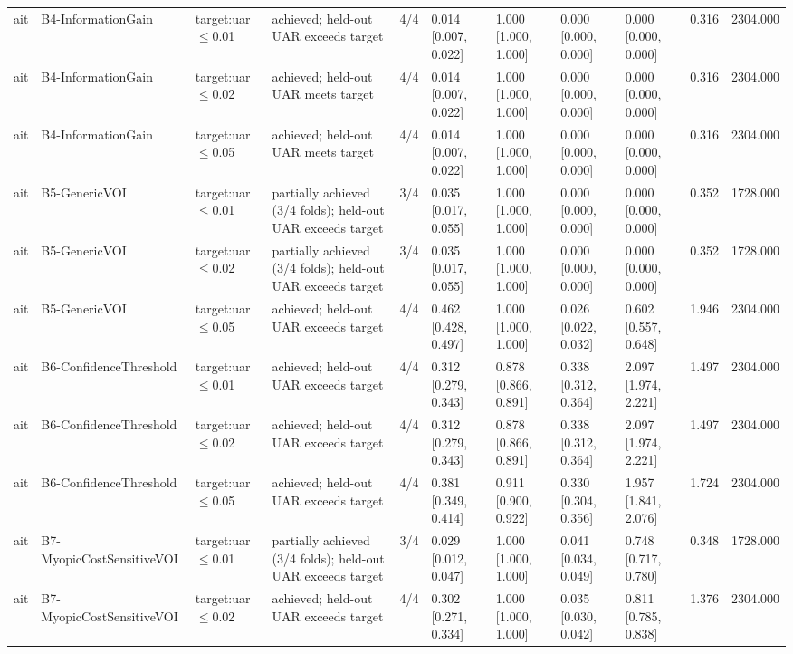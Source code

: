 \begin{table}[!ht]
{\begin{tabular}{lllllllllll}
ait & B4-InformationGain & target:uar$\le$0.01 & achieved; held-out UAR exceeds target & 4/4 & 0.014 [0.007, 0.022] & 1.000 [1.000, 1.000] & 0.000 [0.000, 0.000] & 0.000 [0.000, 0.000] & 0.316 & 2304.000 \\
ait & B4-InformationGain & target:uar$\le$0.02 & achieved; held-out UAR meets target & 4/4 & 0.014 [0.007, 0.022] & 1.000 [1.000, 1.000] & 0.000 [0.000, 0.000] & 0.000 [0.000, 0.000] & 0.316 & 2304.000 \\
ait & B4-InformationGain & target:uar$\le$0.05 & achieved; held-out UAR meets target & 4/4 & 0.014 [0.007, 0.022] & 1.000 [1.000, 1.000] & 0.000 [0.000, 0.000] & 0.000 [0.000, 0.000] & 0.316 & 2304.000 \\
ait & B5-GenericVOI & target:uar$\le$0.01 & partially achieved (3/4 folds); held-out UAR exceeds target & 3/4 & 0.035 [0.017, 0.055] & 1.000 [1.000, 1.000] & 0.000 [0.000, 0.000] & 0.000 [0.000, 0.000] & 0.352 & 1728.000 \\
ait & B5-GenericVOI & target:uar$\le$0.02 & partially achieved (3/4 folds); held-out UAR exceeds target & 3/4 & 0.035 [0.017, 0.055] & 1.000 [1.000, 1.000] & 0.000 [0.000, 0.000] & 0.000 [0.000, 0.000] & 0.352 & 1728.000 \\
ait & B5-GenericVOI & target:uar$\le$0.05 & achieved; held-out UAR exceeds target & 4/4 & 0.462 [0.428, 0.497] & 1.000 [1.000, 1.000] & 0.026 [0.022, 0.032] & 0.602 [0.557, 0.648] & 1.946 & 2304.000 \\
ait & B6-ConfidenceThreshold & target:uar$\le$0.01 & achieved; held-out UAR exceeds target & 4/4 & 0.312 [0.279, 0.343] & 0.878 [0.866, 0.891] & 0.338 [0.312, 0.364] & 2.097 [1.974, 2.221] & 1.497 & 2304.000 \\
ait & B6-ConfidenceThreshold & target:uar$\le$0.02 & achieved; held-out UAR exceeds target & 4/4 & 0.312 [0.279, 0.343] & 0.878 [0.866, 0.891] & 0.338 [0.312, 0.364] & 2.097 [1.974, 2.221] & 1.497 & 2304.000 \\
ait & B6-ConfidenceThreshold & target:uar$\le$0.05 & achieved; held-out UAR exceeds target & 4/4 & 0.381 [0.349, 0.414] & 0.911 [0.900, 0.922] & 0.330 [0.304, 0.356] & 1.957 [1.841, 2.076] & 1.724 & 2304.000 \\
ait & B7-MyopicCostSensitiveVOI & target:uar$\le$0.01 & partially achieved (3/4 folds); held-out UAR exceeds target & 3/4 & 0.029 [0.012, 0.047] & 1.000 [1.000, 1.000] & 0.041 [0.034, 0.049] & 0.748 [0.717, 0.780] & 0.348 & 1728.000 \\
ait & B7-MyopicCostSensitiveVOI & target:uar$\le$0.02 & achieved; held-out UAR exceeds target & 4/4 & 0.302 [0.271, 0.334] & 1.000 [1.000, 1.000] & 0.035 [0.030, 0.042] & 0.811 [0.785, 0.838] & 1.376 & 2304.000 \\

\end{tabular}}
\end{table}
